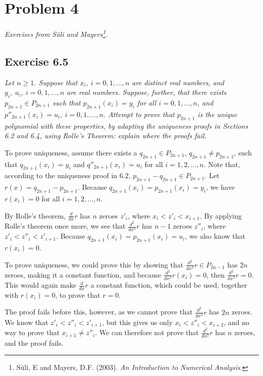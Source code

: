 \section{Problem 4}
\textit{Exercises from Süli and Mayers\footnote{Süli, E and Mayers, D.F. (2003). \textit{An Introduction to Numerical Analysis.}}.}

\subsection{Exercise 6.5}
\textit{Let $n \ge 1$. Suppose that $x_i,\ i = 0, 1, ..., n$ are distinct real numbers, and $y_i,\ u_i,\ i = 0, 1, ..., n$ are real numbers. Suppose, further, that there exists $p_{2n+1} \in P_{2n+1}$ such that $p_{2n+1} (x_i) = y_i$ for all $i = 0, 1, ..., n$, and $p''_{2n+1} (x_i) = u_i,\ i = 0, 1, ..., n$. Attempt to prove that $p_{2n+1}$ is the unique polynomial with these properties, by adapting the uniqueness proofs in Sections 6.2 and 6.4, using Rolle's Theorem: explain where the proofs fail.}

To prove uniqueness, assume there exists a $q_{2n+1} \in P_{2n+1}$, $q_{2n+1} \ne p_{2n+1}$, such that $q_{2n+1}(x_i) = y_i$ and $q''_{2n+1}(x_i) = u_i$ for all $i = 1, 2, ..., n$. Note that, according to the uniqueness proof in 6.2, $p_{2n+1} - q_{2n+1} \in P_{2n+1}$. Let $r(x) = q_{2n+1} - p_{2n+1}$. Because $q_{2n+1}(x_i) = p_{2n+1}(x_i) = y_i$, we have $r(x_i) = 0$ for all $i = 1, 2, ..., n$.

By Rolle's theorem, $\frac{d}{dx} r$ has $n$ zeroes $z'_i$, where $x_i < z'_i < x_{i+1}$. By applying Rolle's theorem once more, we see that $\frac{d^2}{dx^2} r$ has $n - 1$ zeroes $z''_i$, where $z'_i < z''_i < z'_{i+1}$. Because $q_{2n+1}(x_i) = p_{2n+1}(x_i) = u_i$, we also know that $r(x_i) = 0$.

To prove uniqueness, we could prove this by showing that $\frac{d^2}{dx^2} r \in P_{2n-1}$ has $2n$ zeroes, making it a constant function, and because $\frac{d^2}{dx^2} r(x_i) = 0$, then $\frac{d^2}{dx^2} r = 0$. This would again make $\frac{d}{dx} r$ a constant function, which could be used, together with $r(x_i) = 0$, to prove that $r = 0$.

The proof fails before this, however, as we cannot prove that $\frac{d^2}{dx^2} r$ has $2n$ zeroes. We know that $z'_i < z''_i < z'_{i+1}$, but this gives us only $x_i < z''_i < x_{i+2}$, and no way to prove that $x_{i+1} \ne z''_i$. We can therefore not prove that $\frac{d^2}{dx^2} r$ has $n$ zeroes, and the proof fails.


